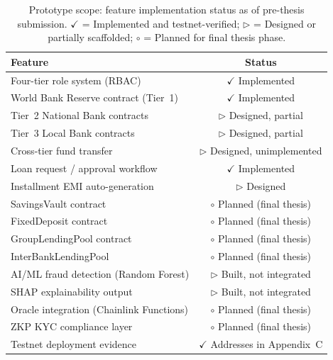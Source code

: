 \documentclass[12pt,a4paper]{report}
\newcommand{\tmarkDone}{\textcolor{green!55!black}{$\checkmark$}}
\newcommand{\tmarkPartial}{\textcolor{orange!85!black}{$\triangleright$}}
\newcommand{\tmarkPlanned}{\textcolor{blue!75!black}{$\circ$}}
\newcommand{\tableheadcolor}{\rowcolor{PrimaryBlue!12}}
\newcommand{\tableheadfont}{\bfseries\small\color{PrimaryBlue}}
\begin{document}
\begin{table}[H]
\centering
\setlength{\tabcolsep}{5pt}
\caption{Prototype scope: feature implementation status as of pre-thesis submission. \tmarkDone{} = Implemented and testnet-verified; \tmarkPartial{} = Designed or partially scaffolded; \tmarkPlanned{} = Planned for final thesis phase.}
\label{tab:prototype-scope}
\renewcommand{\arraystretch}{1.3}
\small
\begin{tabular}{@{}p{7.5cm}c@{}}
\toprule
\tableheadcolor
\tableheadfont Feature & \tableheadfont Status \\
\midrule
Four-tier role system (RBAC) & \tmarkDone{} Implemented \\
\rowcolor{RowShade}
World Bank Reserve contract (Tier~1) & \tmarkDone{} Implemented \\
Tier~2 National Bank contracts & \tmarkPartial{} Designed, partial \\
\rowcolor{RowShade}
Tier~3 Local Bank contracts & \tmarkPartial{} Designed, partial \\
Cross-tier fund transfer & \tmarkPartial{} Designed, unimplemented \\
\rowcolor{RowShade}
Loan request / approval workflow & \tmarkDone{} Implemented \\
Installment EMI auto-generation & \tmarkPartial{} Designed \\
\rowcolor{RowShade}
SavingsVault contract & \tmarkPlanned{} Planned (final thesis) \\
FixedDeposit contract & \tmarkPlanned{} Planned (final thesis) \\
\rowcolor{RowShade}
GroupLendingPool contract & \tmarkPlanned{} Planned (final thesis) \\
InterBankLendingPool & \tmarkPlanned{} Planned (final thesis) \\
\rowcolor{RowShade}
AI/ML fraud detection (Random Forest) & \tmarkPartial{} Built, not integrated \\
SHAP explainability output & \tmarkPartial{} Built, not integrated \\
\rowcolor{RowShade}
Oracle integration (Chainlink Functions) & \tmarkPlanned{} Planned (final thesis) \\
ZKP KYC compliance layer & \tmarkPlanned{} Planned (final thesis) \\
\rowcolor{RowShade}
Testnet deployment evidence & \tmarkDone{} Addresses in Appendix~C \\
\bottomrule
\end{tabular}
\end{table}
\end{document}
